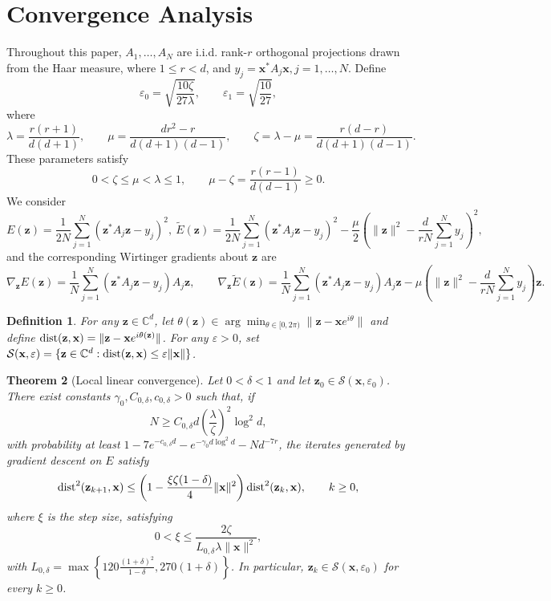\documentclass{article}
\newcommand{\C}{{\mathbb C}}
\newcommand{\calS}{{\mathcal S}}
\newcommand{\dist}{{\rm dist}}
\newcommand{\vx}{{\mathbf x}}
\newcommand{\vz}{{\mathbf z}}
\newcommand{\0}{{\mathbf 0}}
\newtheorem{theorem}{Theorem}[section]
\newtheorem{definition}[theorem]{Definition}
\numberwithin{equation}{section}
\begin{document}
	\section{Convergence Analysis}
	\label{sec:convergence}
	Throughout this paper, $A_1,\ldots,A_N$ are i.i.d. rank-$r$ orthogonal projections drawn from the Haar measure, where $1\le r<d$, and $y_j=\vx^*A_j\vx,j=1,\ldots,N$. Define
	\[
	\varepsilon_0=\sqrt{\frac{10\zeta}{27\lambda}},\qquad
	\varepsilon_1=\sqrt{\frac{10}{27}},
	\]
	where  
	\begin{equation*}
		\lambda=\frac{r(r+1)}{d(d+1)},\qquad \mu=\frac{dr^2-r}{d(d+1)(d-1)},\qquad
		\zeta=\lambda-\mu=\frac{r(d-r)}{d(d+1)(d-1)}.
	\end{equation*}
	These parameters satisfy
	\[
	0<\zeta\le\mu<\lambda\le1,
	\qquad
	\mu-\zeta=\frac{r(r-1)}{d(d-1)}\ge0.
	\]
	We consider
	\begin{equation}\label{model:PR-optimization}
		E(\vz)=\frac{1}{2N}\sum_{j=1}^N(\vz^*A_j\vz-y_j)^2,\ \widetilde E(\vz)=\frac{1}{2N}\sum^{N}_{j=1}\left(\vz^* A_j\vz-y_j\right)^2-\frac\mu2\left(\|\vz\|^2-\frac{d}{rN}\sum^N_{j=1}y_j\right)^2,
	\end{equation}
	and the corresponding Wirtinger gradients about $\vz$ are
	\[
	\nabla_{\vz} E(\vz)=\frac1N\sum_{j=1}^N(\vz^*A_j\vz-y_j)A_j\vz,\qquad\nabla_{\vz} \widetilde E(\vz)=\frac1N\sum_{j=1}^N(\vz^*A_j\vz-y_j)A_j\vz-\mu\left(\|\vz\|^2-\frac{d}{rN}\sum^N_{j=1}y_j\right)\vz.
	\] 
	
	\begin{definition}
		For any $\vz\in\C^d$, let $\theta(\vz)\in\arg\min_{\theta\in[0,2\pi)}\|\vz-\vx e^{i\theta}\| $
		and define $
		\dist(\vz,\vx)=\|\vz-\vx e^{i\theta(\vz)}\| $. 
		For any $\varepsilon>0$, set $
		\calS(\vx,\varepsilon)=\{\vz\in\C^d:\dist(\vz,\vx)\le\varepsilon\|\vx\| \}$.
	\end{definition} 
	
	\begin{theorem}[Local linear convergence]
		\label{theo:convergence}
		Let $0<\delta<1$ and let $\vz_0\in\calS(\vx,\varepsilon_0)$. There exist constants $\gamma_{0},C_{0,\delta},c_{0,\delta}>0$ such that, if
		\begin{equation}\label{eq:N2}
			N\ge C_{0,\delta}d\left(\frac{\lambda}{\zeta}\right)^2\log^2d,
		\end{equation}
		with probability at least
		$
		1-7e^{-c_{0,\delta}d}-e^{-\gamma_{0}d\log^2d}
		-Nd^{-7r}$, 
		the iterates generated by gradient descent on $E$ satisfy
		\begin{equation}\label{eq:local_linear_rate}
			\dist^2(\vz_{k+1},\vx)\le
			\left(1-\frac{\xi\zeta(1-\delta)}4\|\vx\| ^2\right)
			\dist^2(\vz_k,\vx),\qquad k\ge0,
		\end{equation}
		where $\xi$ is the step size, satisfying
		\[
		0<\xi\le\frac{2\zeta}{L_{0,\delta}\lambda\|\vx\|^2},
		\]
		with $L_{0,\delta}=\max\left\{120\frac{(1+\delta)^2}{1-\delta},270(1+\delta)\right\}$. In particular, $\vz_k\in\calS(\vx,\varepsilon_0)$ for every $k\ge0$.
	\end{theorem}
	
\end{document}
